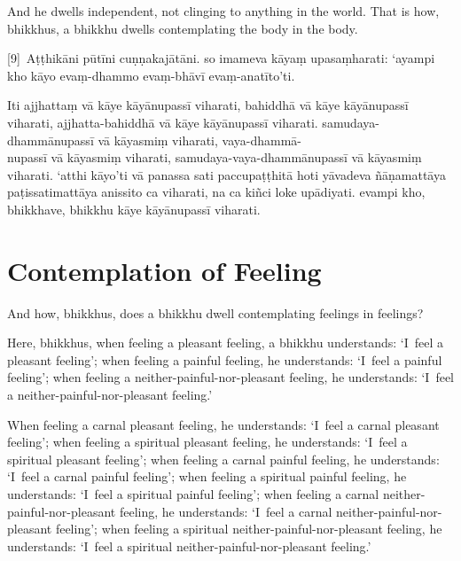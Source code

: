 And he dwells independent, not clinging to anything in the world. That is how,
bhikkhus, a bhikkhu dwells contemplating the body in the body.



\paliPage

[9]~Aṭṭhikāni pūtīni cuṇṇakajātāni. so imameva kāyaṃ upasaṃharati: ‘ayampi kho
kāyo evaṃ-dhammo evaṃ-bhāvī evaṃ-anatīto’ti.

Iti ajjhattaṃ vā kāye kāyānupassī viharati, bahiddhā vā kāye kāyānupassī
viharati, ajjhatta-bahiddhā vā kāye kāyānupassī viharati. samudaya-dhammānupassī
vā kāyasmiṃ viharati, vaya-dhammā-\\
nupassī vā kāyasmiṃ viharati, samudaya-vaya-dhammānupassī vā kāyasmiṃ viharati.
‘atthi kāyo’ti vā panassa sati paccupaṭṭhitā hoti yāvadeva ñāṇamattāya
paṭissatimattāya anissito ca viharati, na ca kiñci loke upādiyati. evampi kho,
bhikkhave, bhikkhu kāye kāyānupassī viharati.



\englishPage
\chapter{Contemplation of Feeling}

And how, bhikkhus, does a bhikkhu dwell contemplating feelings in feelings?

Here, bhikkhus, when feeling a pleasant feeling, a bhikkhu understands:
`I~feel a pleasant feeling';
when feeling a painful feeling, he understands:
`I~feel a painful feeling';
when feeling a neither-painful-nor-pleasant feeling, he understands:
`I~feel a neither-painful-nor-pleasant feeling.'

When feeling a carnal pleasant feeling, he understands:
`I~feel a carnal pleasant feeling';
when feeling a spiritual pleasant feeling, he understands:
`I~feel a spiritual pleasant feeling';
when feeling a carnal painful feeling, he understands:
`I~feel a carnal painful feeling';
when feeling a spiritual painful feeling, he understands:
`I~feel a spiritual painful feeling';
when feeling a carnal neither-painful-nor-pleasant feeling, he understands:
`I~feel a carnal neither-painful-nor-pleasant feeling';
when feeling a spiritual neither-painful-nor-pleasant feeling, he understands:
`I~feel a spiritual neither-painful-nor-pleasant feeling.'


